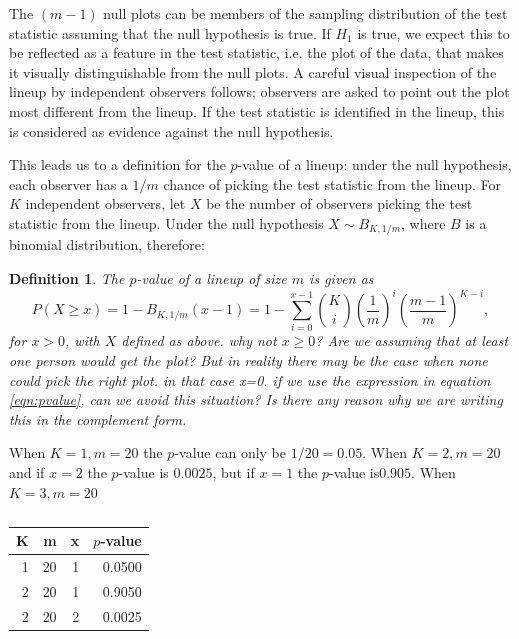 \documentclass{article}
\newcommand{\red}[1]{{\color{red} #1}} %
\newtheorem{dfn}{Definition}[section]
\begin{document}
\noindent The $(m-1)$ null plots can be members of the sampling distribution of the test statistic assuming that the null hypothesis is true. If $H_1$ is true, we expect this to be reflected as a feature in the test statistic, i.e. the plot of the data, that makes it visually distinguishable from the null plots. A careful visual inspection of the lineup by %
independent observers follows;  observers are asked to point out the plot most different from the lineup. If the test statistic is identified in the lineup, this is considered as evidence against the null hypothesis. 

This leads us to a definition for the $p$-value of a lineup: under the null hypothesis, each observer has a $1/m$ chance of picking the test statistic from the lineup.  For $K$ independent observers, let $X$ be  the number of observers picking the test statistic from the lineup. Under the null hypothesis $X \sim B_{K, 1/m}$, where $B$ is a binomial distribution, therefore: 

\begin{dfn}\label{dfn:pvalue}
The $p$-value of a lineup of size $m$ is given as 
\[
P(X \ge x) = 1 - B_{K, 1/m} (x-1) = 1- \sum_{i=0}^{x-1} {K \choose i} \left(\frac{1}{m}\right)^{i} \left(\frac{m-1}{m}\right)^{K-i},
\]
for $x > 0$, with $X$ defined as above. \red{why not $x \ge 0$? Are we assuming that at least one person would get the plot? But in reality there may be the case when none could pick the right plot. in that case x=0. if we use the expression in equation \ref{eqn:pvalue}, can we avoid this situation? Is there any reason why we are writing this in the complement form}.
\end{dfn}
\noindent When $K=1, m=20$ the $p$-value can only be $1/20=0.05$. When $K=2, m=20$ and if $x=2$ the $p$-value is $0.0025$, but if $x=1$ the $p$-value is$0.905$. When $K=3, m=20$

\begin{table}[htp]
\begin{center}
\begin{tabular}{rrrr}
K & m & x & $p$-value \\\hline
1 & 20 & 1 & 0.0500 \\\hline
2 & 20 & 1 & 0.9050 \\
2 & 20 & 2 & 0.0025 \\\hline
\end{tabular}
\end{center}
\caption{}
\label{pvalue}
\end{table}
\end{document}
